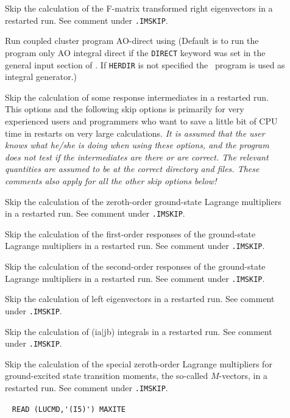 \begin{description}
\item[] 
   Skip the calculation of the F-matrix transformed right eigenvectors
   in a restarted run. See comment under \verb|.IMSKIP|.
%
\item[] 
       Run coupled cluster program AO-direct
       using {\her}
       (Default is to run the program only AO integral direct
       if the \verb+DIRECT+ keyword was set in the general
       input section of \dalton . If \verb+HERDIR+ is not specified the \eri\
       program is used as integral generator.) 
%
\item[] 
   Skip the calculation of some response intermediates in a restarted run.
   This options and the following skip options is primarily for very experienced users 
   and programmers who want to save a little bit of CPU time in restarts on very large 
   calculations. 
   {\em It is assumed that the user knows what he/she is doing when using these options, and
   the program does not test if the intermediates are there or are correct. 
   The relevant quantities are assumed to be at the correct directory and files.
   These comments also apply for all the other skip options below! }
%
\item[]  
   Skip the calculation of the zeroth-order ground-state Lagrange
   multipliers in a restarted run. See comment under \verb|.IMSKIP|.
%
\item[] 
   Skip the calculation of the first-order responses of the 
   ground-state Lagrange multipliers in a restarted run. See comment under \verb|.IMSKIP|.
%
\item[]  
   Skip the calculation of the second-order responses of the 
   ground-state Lagrange multipliers in a restarted run. See comment under \verb|.IMSKIP|.
%
\item[]  
   Skip the calculation of left eigenvectors
   in a restarted run. See comment under \verb|.IMSKIP|.
%
\item[] 
   Skip the calculation of (ia$\mid$jb) integrals in a restarted run. See comment under \verb|.IMSKIP|.
%
\item[] 
   Skip the calculation of the special zeroth-order Lagrange 
   multipliers for ground-excited state transition moments,
   the so-called $M$-vectors, in a restarted run. See comment under \verb|.IMSKIP|.
%
\item[] \verb| |\newline
  \verb|READ (LUCMD,'(I5)') MAXITE|


\end{description}
